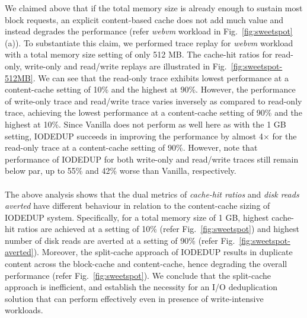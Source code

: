 We claimed above that if the total memory
size is already enough to sustain most block requests,
an explicit content-based cache does not add much value
and instead degrades the performance (refer
\textit{webvm} workload in Fig.~\ref{fig:sweetspot}(a)).
To substantiate this claim, we performed trace replay for \textit{webvm}
workload with a total memory size setting of only 512 MB. The cache-hit
ratios for read-only, write-only
and read/write replays are illustrated in Fig.~\ref{fig:sweetspot-512MB}.
We can see that the read-only trace exhibits
lowest performance at a content-cache setting of 10\% and the highest
at 90\%. However, the performance of write-only trace and read/write trace
varies inversely as compared to read-only trace, achieving the lowest
performance at a content-cache setting of 90\% and the highest
at 10\%.
Since Vanilla does not perform as well here as with the 1 GB
setting, IODEDUP succeeds in improving the performance by
almost 4$\times$ for the read-only trace
at a content-cache setting of 90\%. However, note that performance of
IODEDUP for both write-only and read/write traces still remain below par,
up to 55\% and 42\% worse than Vanilla, respectively.
\\
\\
The above analysis shows that the dual metrics of \textit{cache-hit
ratios} and \textit{disk reads averted} have different behaviour in relation to the
content-cache sizing of IODEDUP system. Specifically,
for a total memory size of 1 GB,
highest cache-hit
ratios are achieved at a setting of 10\% (refer Fig.~\ref{fig:sweetspot})
and highest number of disk reads
are averted at a setting of 90\% (refer Fig.~\ref{fig:sweetspot-averted}).
Moreover,
the split-cache approach of IODEDUP results in duplicate content across the
block-cache and content-cache, hence degrading the overall performance
(refer Fig.~\ref{fig:sweetspot}).
We conclude that the split-cache approach is inefficient, 
and establish the necessity
for an I/O deduplication solution that can perform effectively
even in presence of write-intensive workloads.

